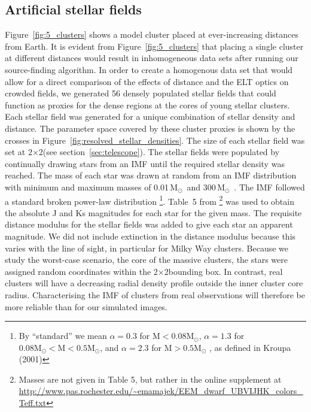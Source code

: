 \documentclass[referee]{aa}
\newcommand{\msun}{M$_\odot$~}
\begin{document}
\subsection{Artificial stellar fields}
  \label{subsec:stellar_fields}
Figure~\ref{fig:5_clusters} shows a model cluster placed at ever-increasing distances from Earth.
It is evident from Figure~\ref{fig:5_clusters} that placing a single cluster at different distances would result in inhomogeneous data sets after running our source-finding algorithm.
In order to create a homogenous data set that would allow for a direct comparison of the effects of distance and the ELT optics on crowded fields, we generated 56 densely populated stellar fields that could function as proxies for the dense regions at the cores of young stellar clusters.
Each stellar field was generated for a unique combination of stellar density and distance.
The parameter space covered by these cluster proxies is shown by the crosses in Figure~\ref{fig:resolved_stellar_densities}.
The size of each stellar field was set at 2\arcsec$\times$2\arcsec (see section~\ref{sec:telescope}).
The stellar fields were populated by continually drawing stars from an IMF until the required stellar density was reached.
The mass of each star was drawn at random from an IMF distribution with minimum and maximum masses of 0.01\,\msun and 300\,\msun.
The IMF followed a standard \citet{kroupa2001} broken power-law distribution
\footnote{By ``standard'' we mean $\alpha=0.3$ for $\mathrm{M} < 0.08 \mathrm{M}_\odot$, $\alpha=1.3$ for $0.08\mathrm{M}_\odot < \mathrm{M} < 0.5 \mathrm{M}_\odot$, and $\alpha=2.3$ for $\mathrm{M} > 0.5 \mathrm{M}_\odot$ , as defined in Kroupa (2001)}.
Table~5 from \citet{pecaut2013}\footnote{Masses are not given in Table 5, but rather in the online supplement at \url{http://www.pas.rochester.edu/~emamajek/EEM_dwarf_UBVIJHK_colors_Teff.txt}}
was used to obtain the absolute J and Ks magnitudes for each star for the given mass.
The requisite distance modulus for the stellar fields was added to give each star an apparent magnitude.
We did not include extinction in the distance modulus because this varies with the line of sight, in particular for Milky Way clusters.
Because we study the worst-case scenario, the core of the massive clusters, the stars were assigned random coordinates within the 2\arcsec$\times$2\arcsec bounding box.
In contrast, real clusters will have a decreasing radial density profile outside the inner cluster core radius.
Characterising the IMF of clusters from real observations will therefore be more reliable than for our simulated images.
\end{document}
